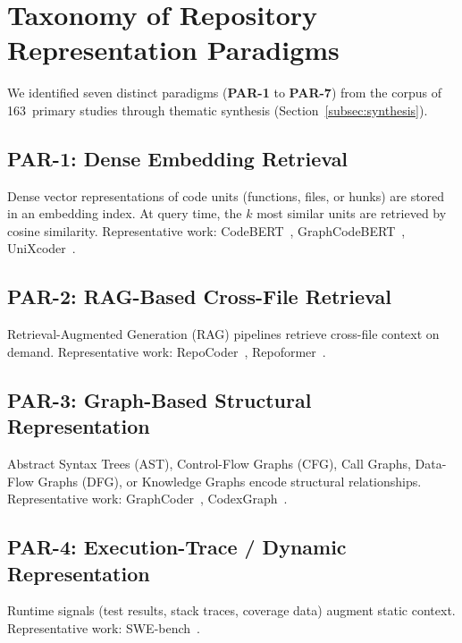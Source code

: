 
\section{Taxonomy of Repository Representation Paradigms}
\label{sec:taxonomy}

We identified seven distinct paradigms (\textbf{PAR-1} to \textbf{PAR-7})
from the corpus of 163~primary studies through thematic synthesis
(Section~\ref{subsec:synthesis}).

\subsection{PAR-1: Dense Embedding Retrieval}
Dense vector representations of code units (functions, files, or hunks) are
stored in an embedding index.  At query time, the $k$ most similar units are
retrieved by cosine similarity.  Representative work:
CodeBERT~\cite{feng2020codebert}, GraphCodeBERT~\cite{guo2021graphcodebert},
UniXcoder~\cite{guo2022unixcoder}.

\subsection{PAR-2: RAG-Based Cross-File Retrieval}
Retrieval-Augmented Generation (RAG) pipelines retrieve cross-file context
on demand.  Representative work: RepoCoder~\cite{zhang2023repocoder},
Repoformer~\cite{wu2024repoformer}.

\subsection{PAR-3: Graph-Based Structural Representation}
Abstract Syntax Trees (AST), Control-Flow Graphs (CFG), Call Graphs, Data-Flow
Graphs (DFG), or Knowledge Graphs encode structural relationships.
Representative work: GraphCoder~\cite{liu2024graphcoder},
CodexGraph~\cite{liu2025codexgraph}.

\subsection{PAR-4: Execution-Trace / Dynamic Representation}
Runtime signals (test results, stack traces, coverage data) augment static
context.  Representative work: SWE-bench~\cite{jimenez2024swebench}.

